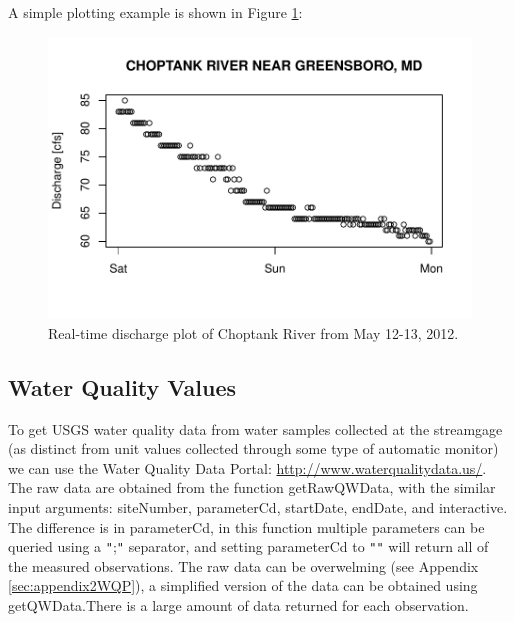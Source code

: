 \documentclass[a4paper,11pt]{article}
\begin{document}
A simple plotting example is shown in Figure \ref{fig:RT}:
\begin{Schunk}
\end{Schunk}
\newpage

\begin{figure}
\begin{center}
\includegraphics{dataRetrieval-fig2}
\end{center}
\caption{Real-time discharge plot of Choptank River from May 12-13, 2012.}
\label{fig:RT}
\end{figure}

\FloatBarrier
\subsection{Water Quality Values}
\label{sec:usgsWQP}
To get USGS water quality data from water samples collected at the streamgage (as distinct from unit values collected through some type of automatic monitor) we can use the Water Quality Data Portal: \url{http://www.waterqualitydata.us/}. The raw data are obtained from the function  getRawQWData, with the similar input arguments: siteNumber, parameterCd, startDate, endDate, and interactive. The difference is in parameterCd, in this function multiple parameters can be queried using a \texttt{"};\texttt{"} separator, and setting parameterCd to \texttt{"}\texttt{"} will return all of the measured observations. The raw data can be overwelming (see Appendix \ref{sec:appendix2WQP}), a simplified version of the data can be obtained using getQWData.There is a large amount of data returned for each observation. 
\end{document}
